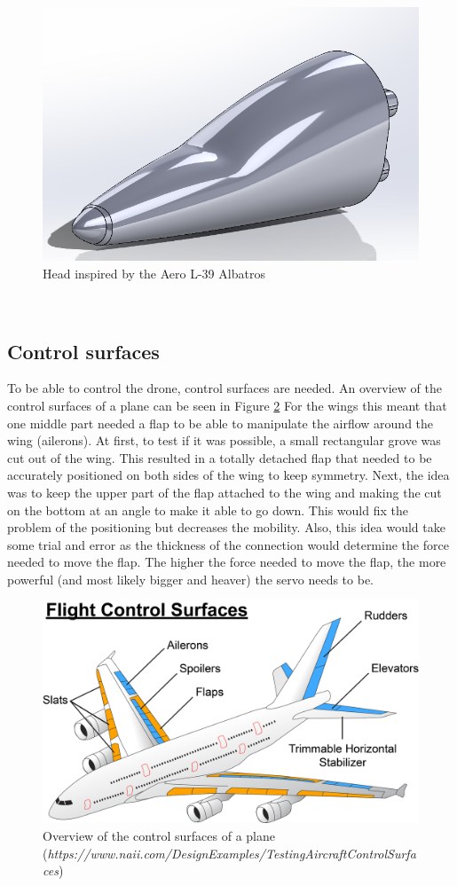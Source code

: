 \begin{figure}
    \centering
    \includegraphics[width=0.5\linewidth]{images/Plane nose.png}
    \caption{Head inspired by the Aero L-39 Albatros}
    \label{fig:Plane nose}
\end{figure}
\\

\subsection{Control surfaces}
To be able to control the drone, control surfaces are needed. An overview of the control surfaces of a plane can be seen in Figure \ref{Control surfaces} For the wings this meant that one middle part needed a flap to be able to manipulate the airflow around the wing (ailerons). At first, to test if it was possible, a small rectangular grove was cut out of the wing. This resulted in a totally detached flap that needed to be accurately positioned on both sides of the wing to keep symmetry. Next, the idea was to keep the upper part of the flap attached to the wing and making the cut on the bottom at an angle to make it able to go down. This would fix the problem of the positioning but decreases the mobility. Also, this idea would take some trial and error as the thickness of the connection would determine the force needed to move the flap. The higher the force needed to move the flap, the more powerful (and most likely bigger and heaver) the servo needs to be.\\

\begin{figure}
    \centering
    \includegraphics[width=0.5\linewidth]{images/Control surfaces.png}
    \caption{Overview of the control surfaces of a plane (\textit{https://www.naii.com/DesignExamples/TestingAircraftControlSurfaces})}
    \label{Control surfaces}
\end{figure}

